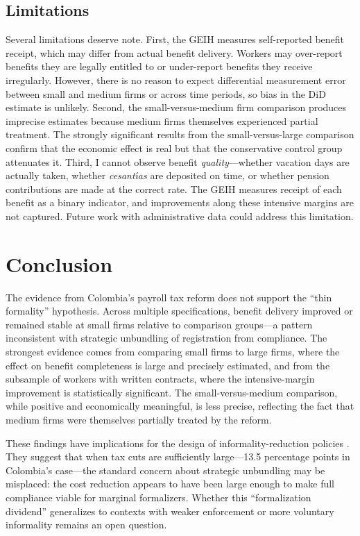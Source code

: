 \documentclass[12pt]{article}
\begin{document}
\subsection{Limitations}

Several limitations deserve note. First, the GEIH measures self-reported benefit receipt, which may differ from actual benefit delivery. Workers may over-report benefits they are legally entitled to or under-report benefits they receive irregularly. However, there is no reason to expect differential measurement error between small and medium firms or across time periods, so bias in the DiD estimate is unlikely. Second, the small-versus-medium firm comparison produces imprecise estimates because medium firms themselves experienced partial treatment. The strongly significant results from the small-versus-large comparison confirm that the economic effect is real but that the conservative control group attenuates it. Third, I cannot observe benefit \textit{quality}---whether vacation days are actually taken, whether \textit{cesant\'{\i}as} are deposited on time, or whether pension contributions are made at the correct rate. The GEIH measures receipt of each benefit as a binary indicator, and improvements along these intensive margins are not captured. Future work with administrative data could address this limitation.

\section{Conclusion}

The evidence from Colombia's payroll tax reform does not support the ``thin formality'' hypothesis. Across multiple specifications, benefit delivery improved or remained stable at small firms relative to comparison groups---a pattern inconsistent with strategic unbundling of registration from compliance. The strongest evidence comes from comparing small firms to large firms, where the effect on benefit completeness is large and precisely estimated, and from the subsample of workers with written contracts, where the intensive-margin improvement is statistically significant. The small-versus-medium comparison, while positive and economically meaningful, is less precise, reflecting the fact that medium firms were themselves partially treated by the reform.

These findings have implications for the design of informality-reduction policies \citep{kanbur2017informality, loayza2016informality}. They suggest that when tax cuts are sufficiently large---13.5 percentage points in Colombia's case---the standard concern about strategic unbundling may be misplaced: the cost reduction appears to have been large enough to make full compliance viable for marginal formalizers. Whether this ``formalization dividend'' generalizes to contexts with weaker enforcement \citep{almeida2012enforcement} or more voluntary informality \citep{levy2008good} remains an open question.
\end{document}
